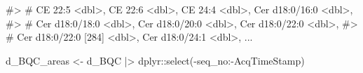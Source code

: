 \documentclass[
  letterpaper,
  DIV=11,
  numbers=noendperiod]{scrreprt}
\newenvironment{Shaded}{\begin{snugshade}}{\end{snugshade}}
\newcommand{\CommentTok}[1]{\textcolor[rgb]{0.37,0.37,0.37}{#1}}
\newcommand{\FunctionTok}[1]{\textcolor[rgb]{0.28,0.35,0.67}{#1}}
\newcommand{\NormalTok}[1]{\textcolor[rgb]{0.00,0.23,0.31}{#1}}
\newcommand{\OtherTok}[1]{\textcolor[rgb]{0.00,0.23,0.31}{#1}}
\newcommand{\SpecialCharTok}[1]{\textcolor[rgb]{0.37,0.37,0.37}{#1}}
\begin{document}
\begin{Shaded}
\begin{Highlighting}[]
\CommentTok{\#\textgreater{} \#   \textasciigrave{}CE 22:5\textasciigrave{} \textless{}dbl\textgreater{}, \textasciigrave{}CE 22:6\textasciigrave{} \textless{}dbl\textgreater{}, \textasciigrave{}CE 24:4\textasciigrave{} \textless{}dbl\textgreater{}, \textasciigrave{}Cer d18:0/16:0\textasciigrave{} \textless{}dbl\textgreater{},}
\CommentTok{\#\textgreater{} \#   \textasciigrave{}Cer d18:0/18:0\textasciigrave{} \textless{}dbl\textgreater{}, \textasciigrave{}Cer d18:0/20:0\textasciigrave{} \textless{}dbl\textgreater{}, \textasciigrave{}Cer d18:0/22:0\textasciigrave{} \textless{}dbl\textgreater{},}
\CommentTok{\#\textgreater{} \#   \textasciigrave{}Cer d18:0/22:0 [284]\textasciigrave{} \textless{}dbl\textgreater{}, \textasciigrave{}Cer d18:0/24:1\textasciigrave{} \textless{}dbl\textgreater{}, ...}

\NormalTok{d\_BQC\_areas }\OtherTok{\textless{}{-}}\NormalTok{ d\_BQC }\SpecialCharTok{|\textgreater{}}\NormalTok{ dplyr}\SpecialCharTok{::}\FunctionTok{select}\NormalTok{(}\SpecialCharTok{{-}}\NormalTok{seq\_no}\SpecialCharTok{:{-}}\NormalTok{AcqTimeStamp)}


\end{Highlighting}
\end{Shaded}
\end{document}

